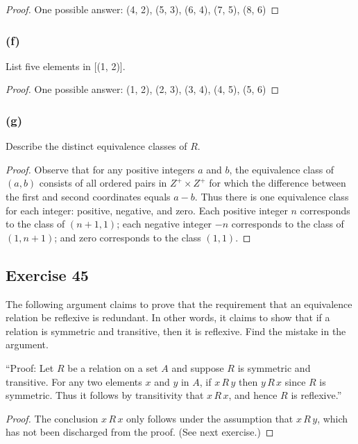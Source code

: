 \documentclass[14pt]{extarticle}
\begin{document}
\begin{proof}
One possible answer: (4, 2), (5, 3), (6, 4), (7, 5), (8, 6)
\end{proof}

\subsubsection{(f)}
List five elements in [(1, 2)].

\begin{proof}
One possible answer: (1, 2), (2, 3), (3, 4), (4, 5), (5, 6)
\end{proof}

\subsubsection{(g)}
Describe the distinct equivalence classes of $R$.

\begin{proof}
Observe that for any positive integers $a$ and $b$, the equivalence class of \((a, b)\) consists of all ordered 
pairs in \(Z^+ \times Z^+\) for which the difference between the first and second coordinates equals \(a - b\). 
Thus there is one equivalence class for each integer: positive, negative, and zero. Each positive integer \(n\) 
corresponds to the class of \((n + 1, 1)\); each negative integer \(-n\) corresponds to the class of \((1, n + 1)\); 
and zero corresponds to the class \((1, 1)\).
\end{proof}

\subsection{Exercise 45}
The following argument claims to prove that the requirement that an equivalence relation be reflexive is redundant. In 
other words, it claims to show that if a relation is symmetric and transitive, then it is reflexive. Find the 
mistake in the argument.

“Proof: Let $R$ be a relation on a set $A$ and suppose $R$ is symmetric and transitive. For any two elements $x$ and 
$y$ in $A$, if \(x \,R\, y\) then \(y \,R\, x\) since $R$ is symmetric. Thus it follows by transitivity that 
\(x \,R\, x\), and hence $R$ is reflexive.”

\begin{proof}
The conclusion \(x \,R\, x\) only follows under the assumption that \(x \,R\, y\), which has not been 
discharged from the proof. (See next exercise.)
\end{proof}
\end{document}
